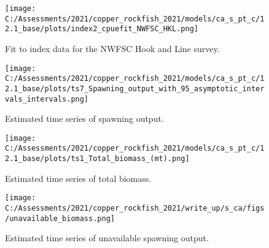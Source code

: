 \documentclass[11pt,
  english,
  a4paper,
]{article}
\begin{document}
\tagmcend\tagstructend


\begin{figure}
\centering
\texttt{[image: C:/Assessments/2021/copper\_rockfish\_2021/models/ca\_s\_pt\_c/12.1\_base/plots/index2\_cpuefit\_NWFSC\_HKL.png]}
\caption{Fit to index data for the NWFSC Hook and Line survey.\label{fig:index-fit}}
\end{figure}

\tagmcend\tagstructend


\begin{figure}
\centering
\texttt{[image: C:/Assessments/2021/copper\_rockfish\_2021/models/ca\_s\_pt\_c/12.1\_base/plots/ts7\_Spawning\_output\_with\_95\_asymptotic\_intervals\_intervals.png]}
\caption{Estimated time series of spawning output.\label{fig:ssb}}
\end{figure}

\tagmcend\tagstructend


\begin{figure}
\centering
\texttt{[image: C:/Assessments/2021/copper\_rockfish\_2021/models/ca\_s\_pt\_c/12.1\_base/plots/ts1\_Total\_biomass\_(mt).png]}
\caption{Estimated time series of total biomass.\label{fig:tot-bio}}
\end{figure}

\tagmcend\tagstructend


\begin{figure}
\centering
\texttt{[image: C:/Assessments/2021/copper\_rockfish\_2021/write\_up/s\_ca/figs/unavailable\_biomass.png]}
\caption{Estimated time series of unavailable spawning output.\label{fig:ssb-unavailable}}
\end{figure}

\tagmcend\tagstructend

\end{document}
